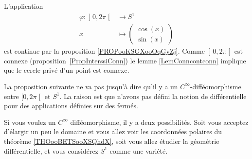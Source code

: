 \begin{example} \label{EXooJFDPooBZADKs}
	L'application
	\begin{equation}
		\begin{aligned}
			\varphi\colon \mathopen] 0 , 2\pi \mathclose[ & \to S^1                \\
			x                                             & \mapsto \begin{pmatrix}
				                                                        \cos(x) \\
				                                                        \sin(x)
			                                                        \end{pmatrix}
		\end{aligned}
	\end{equation}
	est continue par la proposition \ref{PROPooKSGXooOqGyZj}. Comme \( \mathopen] 0 , 2\pi \mathclose[\) est connexe (proposition~\ref{PropInterssiConn}) le lemme \ref{LemConncontconn} implique que le cercle privé d'un point est connexe.
\end{example}

La proposition suivante ne va pas jusqu'à dire qu'il y a un \( C^{\infty}\)-difféomorphisme entre \( \mathopen[ 0,2\pi\mathclose[\) et \( S^1\). La raison est que n'avons pas défini la notion de différentielle pour des applications définies sur des fermés.

Si vous voulez un \( C^{\infty}\) difféomorphisme, il y a deux possibilités. Soit vous acceptez d'élargir un peu le domaine et vous allez voir les coordonnées polaires du théorème \ref{THOooBETSooXSQhdX}, soit vous allez étudier la géométrie différentielle, et vous considérez \( S^1\) comme une variété.


